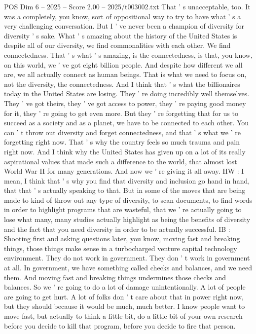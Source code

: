 \begin{textsample}{POS Dim 6 – 2025 – Score 2.00 – 2025/t003002.txt}
That ' s unacceptable, too.
It was a completely, you know, sort of oppositional way to try to have what ' s a very challenging conversation.
But I ' ve never been a champion of diversity for diversity ' s sake.
What ' s amazing about the history of the United States is despite all of our diversity, we find commonalities with each other.
We find connectedness.
That ' s what ' s amazing, is the connectedness, is that, you know, on this world, we ' ve got eight billion people.
And despite how different we all are, we all actually connect as human beings.
That is what we need to focus on, not the diversity, the connectedness.
And I think that ' s what the billionaires today in the United States are losing.
They ' re doing incredibly well themselves.
They ' ve got theirs, they ' ve got access to power, they ' re paying good money for it, they ' re going to get even more.
But they ' re forgetting that for us to succeed as a society and as a planet, we have to be connected to each other.
You can ' t throw out diversity and forget connectedness, and that ' s what we ' re forgetting right now.
That ' s why the country feels so much trauma and pain right now.
And I think why the United States has given up on a lot of its really aspirational values that made such a difference to the world, that almost lost World War II for many generations.
And now we ' re giving it all away.
HW : I mean, I think that ' s why you find that diversity and inclusion go hand in hand, that that ' s actually speaking to that.
But in some of the moves that are being made to kind of throw out any type of diversity, to scan documents, to find words in order to highlight programs that are wasteful, that we ' re actually going to lose what many, many studies actually highlight as being the benefits of diversity and the fact that you need diversity in order to be actually successful.
IB : Shooting first and asking questions later, you know, moving fast and breaking things, those things make sense in a turbocharged venture capital technology environment.
They do not work in government.
They don ' t work in government at all.
In government, we have something called checks and balances, and we need them.
And moving fast and breaking things undermines those checks and balances.
So we ' re going to do a lot of damage unintentionally.
A lot of people are going to get hurt.
A lot of folks don ' t care about that in power right now, but they should because it would be much, much better.
I know people want to move fast, but actually to think a little bit, do a little bit of your own research before you decide to kill that program, before you decide to fire that person.

\end{textsample}
